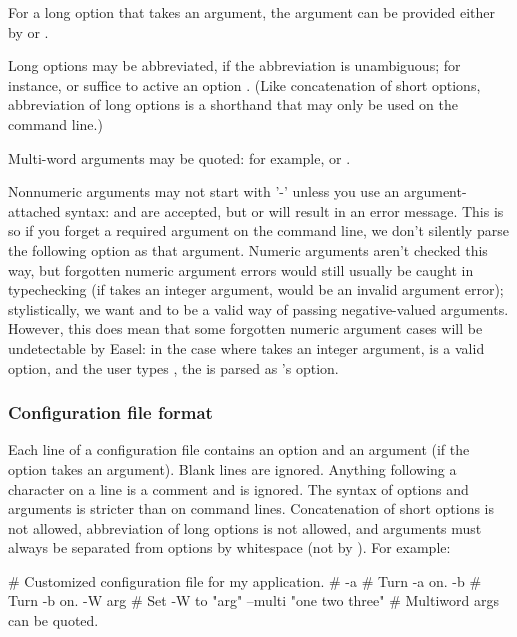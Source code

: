 For a long option that takes an argument, the argument can be provided
either by  or .

Long options may be abbreviated, if the abbreviation is unambiguous;
for instance,  or  suffice to active an
option . (Like concatenation of short options,
abbreviation of long options is a shorthand that may only be used on
the command line.)

Multi-word arguments may be quoted: for example,  or .

Nonnumeric arguments may not start with '-' unless you use an
argument-attached syntax:  and 
are accepted, but  or  will result
in an error message. This is so if you forget a required argument on
the command line, we don't silently parse the following option as that
argument. Numeric arguments aren't checked this way, but forgotten
numeric argument errors would still usually be caught in typechecking
(if  takes an integer argument,  would be an
invalid argument error); stylistically, we want  and
 to be a valid way of passing negative-valued
arguments.  However, this does mean that some forgotten numeric
argument cases will be undetectable by Easel: in the case where
 takes an integer argument,  is a valid option,
and the user types , the  is parsed as
's option.

   \subsubsection{Configuration file format}

Each line of a configuration file contains an option and an argument
(if the option takes an argument). Blank lines are ignored.  Anything
following a \ccode{\#} character on a line is a comment and is
ignored. The syntax of options and arguments is stricter than on
command lines.  Concatenation of short options is not allowed,
abbreviation of long options is not allowed, and arguments must always
be separated from options by whitespace (not by \ccode{=}). For
example:

\begin{cchunk}
   # Customized configuration file for my application.
   #
   -a                        # Turn -a on.
   -b                        # Turn -b on.
   -W      arg               # Set -W to "arg"
   --multi "one two three"   # Multiword args can be quoted.
\end{cchunk}



